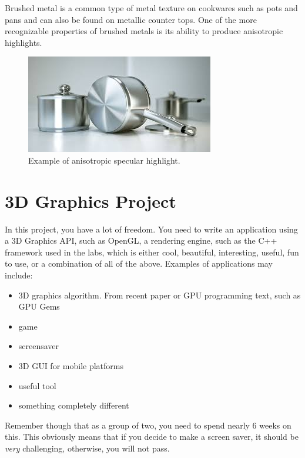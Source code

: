 \documentclass{acmsiggraph}               %
\begin{document}
Brushed metal is a common type of metal texture on cookwares such as pots and
pans and can also be found on metallic counter tops. One of the more
recognizable properties of brushed metals is its ability to produce anisotropic
highlights.

\begin{figure}[!ht]
    \centering
    \includegraphics[width=0.7\columnwidth]{highlight.jpg}
    \caption{Example of anisotropic specular highlight.}
    \label{anisotropic_highlight}
\end{figure}

%

\section{3D Graphics Project}
In this project, you have a lot of freedom. You need to write
an application using a 3D Graphics API, such as OpenGL, a rendering engine, such as the C++ framework used in the labs, which is either
cool, beautiful, interesting, useful, fun to use, or a combination of all of the above.
Examples of applications may include:
\begin{itemize}
    \item 3D graphics algorithm. From recent paper or GPU programming text, such as GPU Gems
    \item game
    \item screensaver
    \item 3D GUI for mobile platforms
    \item useful tool
    \item something completely different
\end{itemize}
Remember though that as a group of two, you need to spend nearly 6 weeks on this.
This obviously means that if you decide to make a screen saver, it should be \textit{very}
challenging, otherwise, you will not pass.
\end{document}
